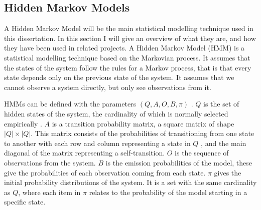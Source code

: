 \documentclass{article}
\begin{document}
%   

\subsection{Hidden Markov Models}






A Hidden Markov Model will be the main statistical modelling technique used in this dissertation.
In this section I will give an overview of what they are, and how they have been used in related projects.
A Hidden Markov Model (HMM) is a statistical modelling technique based on the Markovian process. %
It assumes that the states of the system follow the rules for a Markov process, that is that every state depends only on the previous state of the system.
It assumes that we cannot observe a system directly, but only see observations from it.

HMMs can be defined with the parameters $(Q,A,O,B,\pi)$ \cite{jurafsky2018speech}.
$Q$ is the set of hidden states of the system, the cardinality of which is normally selected empirically \cite{ibe2013markov}.
$A$ is a transition probability matrix, a square matrix of shape $|Q|\times|Q|$.
This matrix consists of the probabilities of transitioning from one state to another with each row and column representing a state in $Q$
, and the main diagonal of the matrix representing a self-transition.
$O$ is the sequence of observations from the system.
$B$ is the emission probabilities of the model, these give the probabilities of each observation coming from each state.
$\pi$ gives the initial probability distributions of the system.
It is a set with the same cardinality as $Q$, where each item in $\pi$ relates to the probability of the model starting in a specific state.
\end{document}
